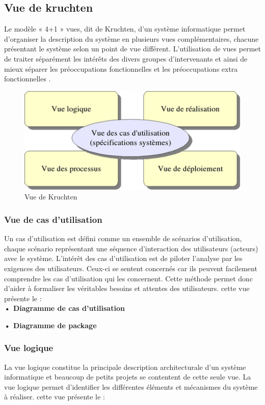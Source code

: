 \documentclass[11pt,a4paper,oneside]{book}
\begin{document}
			\subsection{Vue de kruchten}
			Le modèle « 4+1 » vues, dit de Kruchten, d’un système informatique permet d’organiser la description du système en plusieurs vues complémentaires, chacune présentant le système selon un point de vue différent. L’utilisation de vues permet de traiter séparément les intérêts des divers groupes d’intervenants et ainsi de mieux séparer les préoccupations fonctionnelles et les préoccupations extra fonctionnelles .
			\begin{figure}[H]
				\centering
				\includegraphics[width=1\textwidth]{"Images/ch3/Modele_architecture_Kruchten"}
				\caption{Vue de Kruchten}
				\label{fig:400px-modelearchitecturekruchten}
			\end{figure}
			\subsubsection{Vue de cas d’utilisation}
			Un cas d’utilisation est défini comme un ensemble de scénarios d’utilisation, chaque scénario représentant une séquence d’interaction des utilisateurs (acteurs) avec le système. L’intérêt des cas d’utilisation est de piloter l’analyse par les exigences des utilisateurs. Ceux-ci se sentent concernés car ils peuvent facilement comprendre les cas d’utilisation qui les concernent. Cette méthode permet donc d’aider à formaliser les véritables besoins et attentes des utilisateurs. cette vue présente le :
			\\
			
			\textbf{• Diagramme de cas d’utilisation}
			
			\textbf{• Diagramme de package}
			\subsubsection{Vue logique}
			La vue logique constitue la principale description architecturale d’un système informatique et beaucoup de petits projets se contentent de cette seule vue. La vue logique permet d’identifier les différentes éléments et mécanismes du système à réaliser. cette vue présente le :
			\\
			
\end{document}
